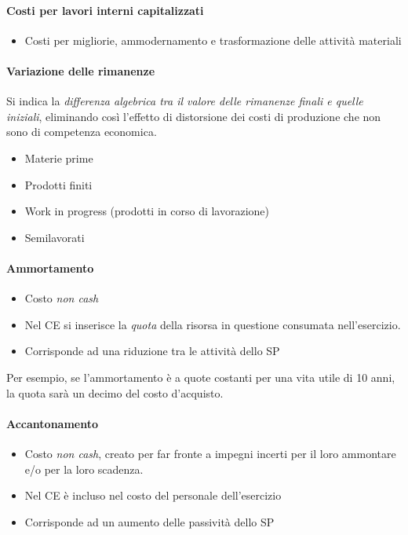 \documentclass[10pt,a4paper,fleqn,oneside]{book}
\begin{document}
\paragraph{Costi per lavori interni capitalizzati}
\begin{itemize}
    \item Costi per migliorie, ammodernamento
    e trasformazione delle attività materiali
\end{itemize}

\paragraph{Variazione delle rimanenze}
Si indica la \emph{differenza algebrica tra il valore delle rimanenze finali e quelle
iniziali}, eliminando così l’effetto di distorsione dei costi di produzione che non sono di
competenza economica.

\begin{itemize}
    \item Materie prime
    \item Prodotti finiti
    \item Work in progress (prodotti in corso di lavorazione)
    \item Semilavorati
\end{itemize}

\paragraph{Ammortamento}
\begin{itemize}
    \item Costo \emph{non cash}
    \item Nel CE si inserisce la \emph{quota} della risorsa in questione consumata nell'\gls{esercizio}.
    \item Corrisponde ad una riduzione tra le attività dello SP
\end{itemize}

Per esempio, se l'ammortamento è a quote costanti per una vita utile
di 10 anni, la quota sarà un decimo del costo d'acquisto.

\paragraph{Accantonamento}
\begin{itemize}
    \item Costo \emph{non cash}, creato per far fronte a impegni incerti per il loro ammontare e/o per la
    loro scadenza.
    \item Nel CE è incluso nel costo del personale dell’esercizio
    \item Corrisponde ad un aumento delle passività dello SP
\end{itemize}
\end{document}
